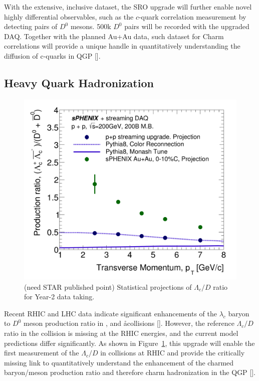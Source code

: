 With the extensive, inclusive dataset, the SRO upgrade will further enable novel highly differential observables, such as the $c$-quark correlation measurement by detecting pairs of $D^0$ mesons. 500k $D^0$ pairs will be recorded with the upgraded DAQ. Together with the planned Au+Au data, such dataset for Charm correlations will provide a unique handle in quantitatively understanding the diffusion of c-quarks in QGP []. 

\subsection{Heavy Quark Hadronization}



\begin{figure}[htbp]
\begin{center}
\includegraphics[width=.49\linewidth]{figs/RAA_DB_theory_root_LcD0Ratio_pp200B.pdf}
\caption{(need STAR published point) Statistical projections of $\Lambda_c/D$ ratio for Year-2 data taking.}
\label{fig:Lc-D0}
\end{center}
\end{figure}



Recent RHIC and LHC data indicate significant enhancements of the  $\lambda_c$ baryon to $D^0$ meson production ratio in \pp,  \pA and \aa  collisions []. However, the reference $\Lambda_c/D$ ratio in the \pp collision is missing at the RHIC energies, and the current model predictions differ significantly. As shown in Figure~\ref{fig:Lc-D0}, this upgrade will enable the first measurement of the $\Lambda_c/D$ in \pp collisions at RHIC and provide the critically missing link to quantitatively understand the enhancement of the charmed baryon/meson production ratio and therefore charm hadronization in the QGP []. 


